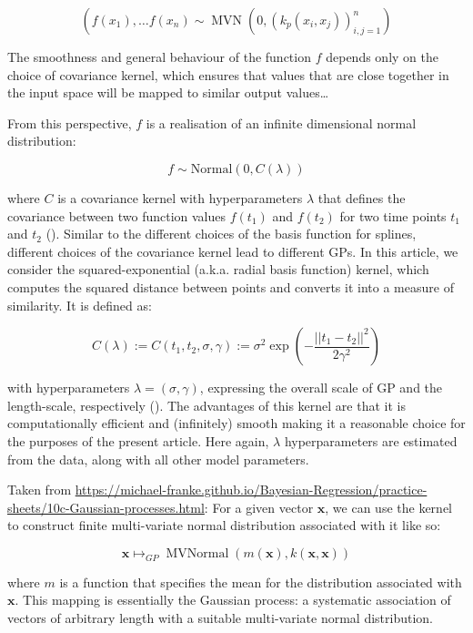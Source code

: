 \documentclass[
  doc,
  floatsintext,
  longtable,
  a4paper,
  nolmodern,
  notxfonts,
  notimes,
  colorlinks=true,linkcolor=blue,citecolor=blue,urlcolor=blue]{apa7}
\begin{document}
\[
\left(f\left(x_{1}\right), \ldots f\left(x_{n}\right) \sim \operatorname{MVN}\left(0, \left(k_p\left(x_{i}, x_{j}\right)\right)_{i, j=1}^{n}\right)\right.
\]

The smoothness and general behaviour of the function \(f\) depends only
on the choice of covariance kernel, which ensures that values that are
close together in the input space will be mapped to similar output
values\ldots{}

From this perspective, \(f\) is a realisation of an infinite dimensional
normal distribution:

\[
f \sim \mathrm{Normal}(0, C(\lambda))
\]

where \(C\) is a covariance kernel with hyperparameters \(\lambda\) that
defines the covariance between two function values \(f\left(t_1\right)\)
and \(f\left(t_2\right)\) for two time points \(t_1\) and \(t_2\)
(). Similar to
the different choices of the basis function for splines, different
choices of the covariance kernel lead to different GPs. In this article,
we consider the squared-exponential (a.k.a. radial basis function)
kernel, which computes the squared distance between points and converts
it into a measure of similarity. It is defined as:

\[
C(\lambda) := C\left(t_1, t_2, \sigma, \gamma\right) := \sigma^2 \exp \left(-\frac{||t_1-t_2||^{2}}{2 \gamma^2}\right)
\]

with hyperparameters \(\lambda = (\sigma, \gamma)\), expressing the
overall scale of GP and the length-scale, respectively
(). The
advantages of this kernel are that it is computationally efficient and
(infinitely) smooth making it a reasonable choice for the purposes of
the present article. Here again, \(\lambda\) hyperparameters are
estimated from the data, along with all other model parameters.

Taken from
\url{https://michael-franke.github.io/Bayesian-Regression/practice-sheets/10c-Gaussian-processes.html}:
For a given vector \(\mathbf{x}\), we can use the kernel to construct
finite multi-variate normal distribution associated with it like so:

\[
\mathbf{x} \mapsto_{G P} \operatorname{MVNormal}(m(\mathbf{x}), k(\mathbf{x}, \mathbf{x}))
\]

where \(m\) is a function that specifies the mean for the distribution
associated with \(\mathbf{x}\). This mapping is essentially the Gaussian
process: a systematic association of vectors of arbitrary length with a
suitable multi-variate normal distribution.
\end{document}

